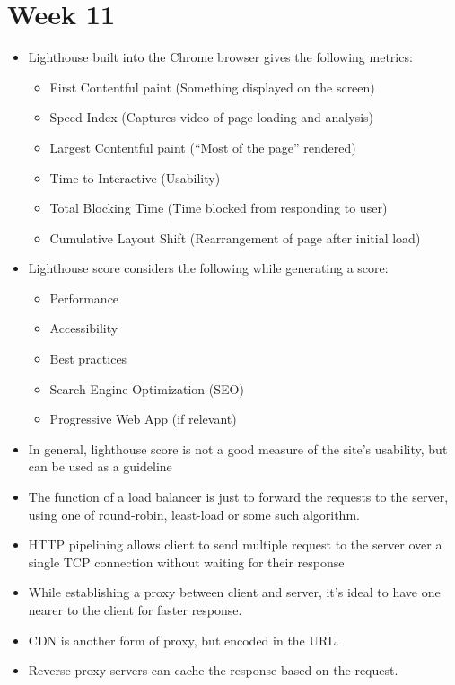 \documentclass[a4paper]{article}
\begin{document}
\section{Week 11}
\begin{itemize}
    \item Lighthouse built into the Chrome browser gives the following metrics:
    \begin{itemize}
        \item First Contentful paint (Something displayed on the screen)
        \item Speed Index (Captures video of page loading and analysis)
        \item Largest Contentful paint (“Most of the page” rendered)
        \item Time to Interactive (Usability)
        \item Total Blocking Time (Time blocked from responding to user)
        \item Cumulative Layout Shift (Rearrangement of page after initial load)
    \end{itemize}
    \item Lighthouse score considers the following while generating a score:
    \begin{itemize}
        \item Performance
        \item Accessibility
        \item Best practices
        \item Search Engine Optimization (SEO)
        \item Progressive Web App (if relevant)
    \end{itemize}
    \item In general, lighthouse score is not a good measure of the site’s usability, but can be used as a guideline
    \item The function of a load balancer is just to forward the requests to the server, using one of round-robin, least-load  or some such algorithm.
    \item HTTP pipelining allows client to send multiple request to the server over a single TCP connection without waiting for their response
    \item While establishing a proxy between client and server, it’s ideal to have one nearer to the client for faster response.
    \item CDN is another form of proxy, but encoded in the URL.
    \item Reverse proxy servers can cache the response based on the request.

\end{itemize}
\end{document}
